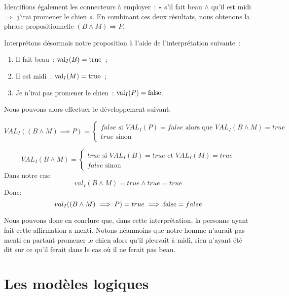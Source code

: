 Identifions également les connecteurs à employer~: « s’il fait beau $\land$
  qu'il est midi $\Rightarrow$ j’irai promener le chien ». En combinant ces deux
résultats, nous obtenons la phrase propositionnelle $(B \land M) \Rightarrow P$.

Interprétons désormais notre proposition à l’aide de l’interprétation suivante~:
\begin{enumerate}
  \item Il fait beau~: $\mathrm{val}_I(B) = \mathrm{true}$~;
  \item Il est midi~: $\mathrm{val}_I(M) = \mathrm{true}$~;
  \item Je n’irai pas promener le chien~: $\mathrm{val}_I(P) = \mathrm{false}$.
\end{enumerate}

Nous pouvons alors effectuer le développement suivant:

\[
VAL_I((B \land M) \implies P) = 
	\begin{cases}
		false \text{ si }VAL_I(P) = false \text{ alors que } VAL_I(B \land M) = true\\
		true  \text{ sinon }
	\end{cases}
\]

\[
VAL_I(B \land M) = 
	\begin{cases}
		true \text{ si }VAL_I(B) = true \text{ et } VAL_I(M) = true\\
		false  \text{ sinon }
	\end{cases}
\]
Dans notre cas: 
\[val_I(B \land M) = true \land true =true \]
Donc: 
\[val_I((B \land M)\implies P) = true \implies \mathrm{false} = false\]


Nous pouvons donc en conclure que, dans cette interprétation, la personne ayant
fait cette affirmation a menti. Notons néanmoins que notre homme n'aurait pas
menti en partant promener le chien alors qu'il pleuvait à midi, rien n'ayant
été dit sur ce qu'il ferait dans le cas où il ne ferait pas beau.


\section{Les modèles logiques}

